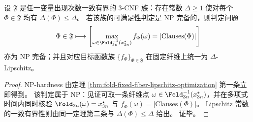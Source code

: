 \begin{corollary}\label{cor:fold-fixed-fiber-constant-lipschitz-optimization-np-complete}
设 \(\mathfrak F\) 是任一变量出现次数一致有界的 \(3\)-CNF 族：存在常数 \(\Delta\ge 1\) 使对每个 \(\Phi\in\mathfrak F\) 均有 \(\Delta(\Phi)\le \Delta\)。
若该族的可满足性判定是 NP 完备的，则判定问题
\[
\Phi\in\mathfrak F
\longmapsto
\left[
\max_{\omega\in\Fold_{3n}^{-1}(x^\star_{3n})}f_\Phi(\omega)=|\mathrm{Clauses}(\Phi)|
\right]
\]
亦为 NP 完备；并且对应目标函数族 \(\{f_\Phi\}_{\Phi\in\mathfrak F}\) 在固定纤维上统一为 \(\Delta\)-Lipschitz。
\end{corollary}
\begin{proof}
NP-hardness 由定理 \ref{thm:fold-fixed-fiber-lipschitz-optimization} 第一条立即得到。
该判定属于 NP：见证可取一条纤维点 \(\omega\in\Fold_{3n}^{-1}(x^\star_{3n})\)，并在多项式时间内同时核验
\(
\Fold_{3n}(\omega)=x^\star_{3n}
\)
与
\(
f_\Phi(\omega)=|\mathrm{Clauses}(\Phi)|
\)。
Lipschitz 常数的一致有界性则由同一定理第二条与 \(\Delta(\Phi)\le \Delta\) 给出。
证毕。
\end{proof}

\endinput
